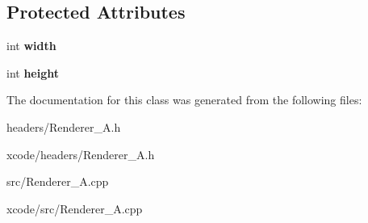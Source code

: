 \subsection*{Protected Attributes}
\begin{DoxyCompactItemize}
\item 
\hypertarget{class_renderer___a_a0ca3fbb31eb776ee00b70536f267dfe7}{int {\bfseries width}}\label{class_renderer___a_a0ca3fbb31eb776ee00b70536f267dfe7}

\item 
\hypertarget{class_renderer___a_a36d0dfb8eeccad9e1ff0b0c461632f6a}{int {\bfseries height}}\label{class_renderer___a_a36d0dfb8eeccad9e1ff0b0c461632f6a}

\end{DoxyCompactItemize}


The documentation for this class was generated from the following files\-:\begin{DoxyCompactItemize}
\item 
headers/Renderer\-\_\-\-A.\-h\item 
xcode/headers/Renderer\-\_\-\-A.\-h\item 
src/Renderer\-\_\-\-A.\-cpp\item 
xcode/src/Renderer\-\_\-\-A.\-cpp\end{DoxyCompactItemize}
